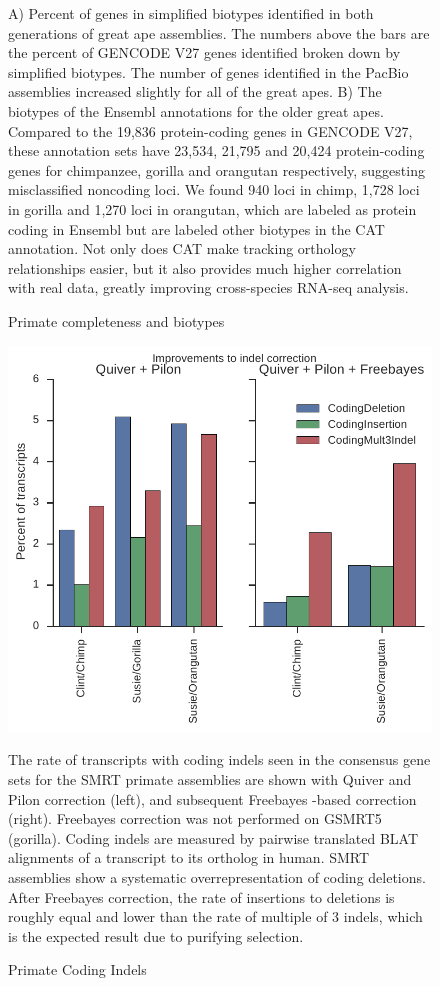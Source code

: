 \documentclass[fleqn,10pt]{wlscirep}
\begin{document}
\begin{figure}
\caption{Primate completeness and biotypes}
A) Percent of genes in simplified biotypes identified in both generations of great ape assemblies. The numbers above the bars are the percent of GENCODE V27 genes identified broken down by simplified biotypes. The number of genes identified in the PacBio assemblies increased slightly for all of the great apes. B) The biotypes of the Ensembl annotations for the older great apes. Compared to the 19,836 protein-coding genes in GENCODE V27, these annotation sets have 23,534, 21,795 and 20,424 protein-coding genes for chimpanzee, gorilla and orangutan respectively, suggesting misclassified noncoding loci. We found 940 loci in chimp, 1,728 loci in gorilla and 1,270 loci in orangutan, which are labeled as protein coding in Ensembl but are labeled other biotypes in the CAT annotation. Not only does CAT make tracking orthology relationships easier, but it also provides much higher correlation with real data, greatly improving cross-species RNA-seq analysis.
\label{supp_fig:primate_completeness}
\end{figure}

\begin{figure}
\centering
\includegraphics[width=\textwidth,height=\textheight,keepaspectratio]{primate_indels.pdf}
\caption{Primate Coding Indels}
The rate of transcripts with coding indels seen in the consensus gene sets for the SMRT primate assemblies are shown with Quiver and Pilon correction (left), and subsequent Freebayes  \citep{garrison2012haplotype}-based correction (right). Freebayes correction was not performed on GSMRT5 (gorilla). Coding indels are measured by pairwise translated BLAT alignments of a transcript to its ortholog in human. SMRT assemblies show a systematic overrepresentation of coding deletions. After Freebayes correction, the rate of insertions to deletions is roughly equal and lower than the rate of multiple of 3 indels, which is the expected result due to purifying selection.
\label{supp_fig:primate_indels}
\end{figure}
\end{document}

